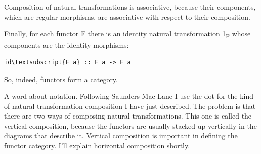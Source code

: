 \begin{figure}[H]
\centering
{}
\end{figure}

\noindent
Composition of natural transformations is associative, because their
components, which are regular morphisms, are associative with respect to
their composition.

Finally, for each functor F there is an identity natural transformation
1\textsubscript{F} whose components are the identity morphisms:

\begin{Verbatim}[commandchars=\\\{\}]
id\textsubscript{F a} :: F a -> F a
\end{Verbatim}
So, indeed, functors form a category.

A word about notation. Following Saunders Mac Lane I use the dot for the
kind of natural transformation composition I have just described. The
problem is that there are two ways of composing natural transformations.
This one is called the vertical composition, because the functors are
usually stacked up vertically in the diagrams that describe it. Vertical
composition is important in defining the functor category. I'll explain
horizontal composition shortly.

\begin{figure}
\centering
{}
\end{figure}

